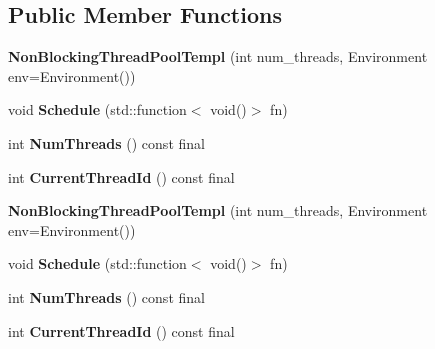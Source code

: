 \subsection*{Public Member Functions}
\begin{DoxyCompactItemize}
\item 
\mbox{\label{class_eigen_1_1_non_blocking_thread_pool_templ_a00df8e60e6adedb916d8b8cc398ffc14}} 
{\bfseries Non\+Blocking\+Thread\+Pool\+Templ} (int num\+\_\+threads, Environment env=Environment())
\item 
\mbox{\label{class_eigen_1_1_non_blocking_thread_pool_templ_afd256875cc920b676870eabef26973d6}} 
void {\bfseries Schedule} (std\+::function$<$ void()$>$ fn)
\item 
\mbox{\label{class_eigen_1_1_non_blocking_thread_pool_templ_ae13c67e050790cea1fd53b7e35def01b}} 
int {\bfseries Num\+Threads} () const final
\item 
\mbox{\label{class_eigen_1_1_non_blocking_thread_pool_templ_ae9b856a402c214b099c86cbab5d620ca}} 
int {\bfseries Current\+Thread\+Id} () const final
\item 
\mbox{\label{class_eigen_1_1_non_blocking_thread_pool_templ_a00df8e60e6adedb916d8b8cc398ffc14}} 
{\bfseries Non\+Blocking\+Thread\+Pool\+Templ} (int num\+\_\+threads, Environment env=Environment())
\item 
\mbox{\label{class_eigen_1_1_non_blocking_thread_pool_templ_afd256875cc920b676870eabef26973d6}} 
void {\bfseries Schedule} (std\+::function$<$ void()$>$ fn)
\item 
\mbox{\label{class_eigen_1_1_non_blocking_thread_pool_templ_ae13c67e050790cea1fd53b7e35def01b}} 
int {\bfseries Num\+Threads} () const final
\item 
\mbox{\label{class_eigen_1_1_non_blocking_thread_pool_templ_ae9b856a402c214b099c86cbab5d620ca}} 
int {\bfseries Current\+Thread\+Id} () const final
\end{DoxyCompactItemize}


